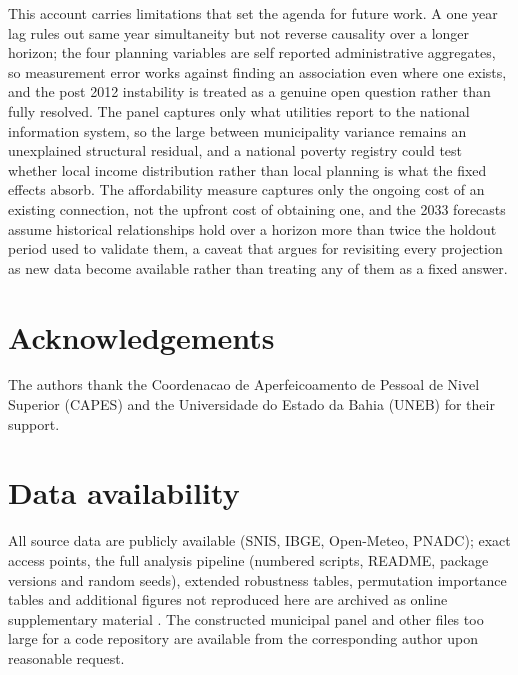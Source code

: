 \documentclass[preprint,12pt]{elsarticle}
\begin{document}
This account carries limitations that set the agenda for future work. A one year lag rules out same year simultaneity but not reverse causality over a longer horizon; the four planning variables are self reported administrative aggregates, so measurement error works against finding an association even where one exists, and the post 2012 instability is treated as a genuine open question rather than fully resolved. The panel captures only what utilities report to the national information system, so the large between municipality variance remains an unexplained structural residual, and a national poverty registry could test whether local income distribution rather than local planning is what the fixed effects absorb. The affordability measure captures only the ongoing cost of an existing connection, not the upfront cost of obtaining one, and the 2033 forecasts assume historical relationships hold over a horizon more than twice the holdout period used to validate them, a caveat that argues for revisiting every projection as new data become available rather than treating any of them as a fixed answer.

\section*{Acknowledgements}

The authors thank the Coordenacao de Aperfeicoamento de Pessoal de Nivel Superior (CAPES) and the Universidade do Estado da Bahia (UNEB) for their support.

\section*{Data availability}

All source data are publicly available (SNIS, IBGE, Open-Meteo, PNADC); exact access points, the full analysis pipeline (numbered scripts, README, package versions and random seeds), extended robustness tables, permutation importance tables and additional figures not reproduced here are archived as online supplementary material \citep{Figueredo2026Repo}. The constructed municipal panel and other files too large for a code repository are available from the corresponding author upon reasonable request.



\end{document}
